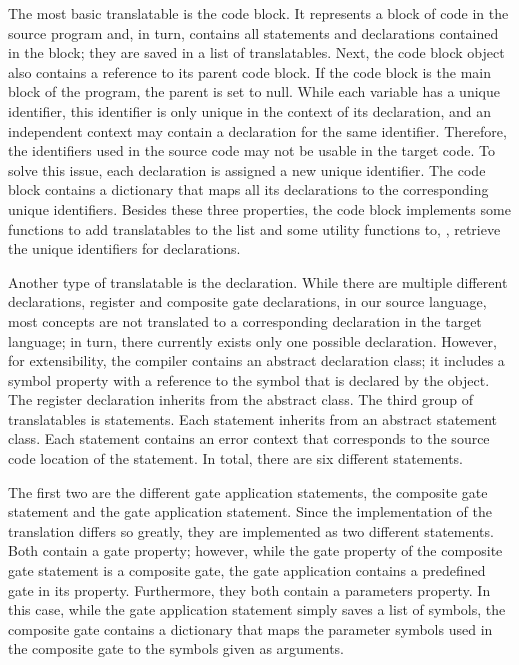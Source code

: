 The most basic translatable is the code block. It represents a block of code in the source program and, in turn, contains all statements and declarations contained in the block; they are saved in a list of translatables. Next, the code block object also contains a reference to its parent code block. If the code block is the main block of the program, the parent is set to null. While each variable has a unique identifier, this identifier is only unique in the context of its declaration, and an independent context may contain a declaration for the same identifier. Therefore, the identifiers used in the source code may not be usable in the target code. To solve this issue, each declaration is assigned a new unique identifier. The code block contains a dictionary that maps all its declarations to the corresponding unique identifiers. Besides these three properties, the code block implements some functions to add translatables to the list and some utility functions to, \eg, retrieve the unique identifiers for declarations.

Another type of translatable is the declaration. While there are multiple different declarations, \eg register and composite gate declarations, in our source language, most concepts are not translated to a corresponding declaration in the target language; in turn, there currently exists only one possible declaration. However, for extensibility, the compiler contains an abstract declaration class; it includes a symbol property with a reference to the symbol that is declared by the object. The register declaration inherits from the abstract class.
The third group of translatables is statements. Each statement inherits from an abstract statement class. Each statement contains an error context that corresponds to the source code location of the statement. In total, there are six different statements. 

The first two are the different gate application statements, the composite gate statement and the gate application statement. Since the implementation of the translation differs so greatly, they are implemented as two different statements. Both contain a gate property; however, while the gate property of the composite gate statement is a composite gate, the gate application contains a predefined gate in its property. Furthermore, they both contain a parameters property. In this case, while the gate application statement simply saves a list of symbols, the composite gate contains a dictionary that maps the parameter symbols used in the composite gate to the symbols given as arguments.

